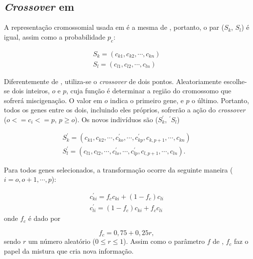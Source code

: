 \subsection{\emph{Crossover} em \cite{metodo2011}}	

	A representação cromossomial usada em \cite{metodo2011} é a mesma de \cite{metodo2004}, portanto, o par ($S_k$, $S_l$) é igual, assim como a probabilidade $p_c$:
	
	\begin{equation}
		\begin{array}{l}
		S_k = (c_{k1}, c_{k2}, \cdots, c_{kn})	\\
		S_l = (c_{l1}, c_{l2}, \cdots, c_{ln})	
		\end{array}
	\end{equation}
	
	Diferentemente de \cite{metodo2004}, utiliza-se o \emph{crossover} de dois pontos. Aleatoriamente escolhe-se dois inteiros, $o$ e $p$, cuja função é determinar a região do cromossomo que sofrerá miscigenação. O valor em $o$ indica o primeiro gene, e $p$ o último. Portanto, todos os genes entre os dois, incluindo eles próprios, sofrerão a ação do \emph{crossover} ($o <= c_i <= p$, $p \geq o$). Os novos indivíduos são ($S^{'}_k$, $^{'}S_l$)
	
	\begin{equation}
		\begin{array}{l}
			S^{'}_k = (c_{k1}, c_{k2}, \cdots, c^{'}_{ko}, \cdots , c^{'}_{kp}, c_{k,p+1}, \cdots, c_{kn})	\\
			S^{'}_l = (c_{l1}, c_{l2}, \cdots, c^{'}_{lo}, \cdots , c^{'}_{lp}, c_{l,p+1}, \cdots, c_{ln}).	
		\end{array}
	\end{equation}
	
	Para todos genes selecionados, a transformação ocorre da seguinte maneira ($i = o, o + 1, \cdots, p$):
	
	\begin{equation}
		\begin{array}{l}
			c^{'}_{ki} = f_c c_{ki} + (1 - f_c) c_{li}     \\
			c^{'}_{li} = (1 - f_c) c_{ki} + f_c c_{li}
		\end{array}
	\end{equation}
	onde $f_c$ é dado por
	
	\begin{equation}
		f_c = 0,75 + 0,25r,
	\end{equation}
	sendo $r$ um número aleatório ($0 \leq r \leq 1$). Assim como o parâmetro $f$ de \cite{metodo2004}, $f_c$ faz o papel da mistura que cria nova informação.
	
